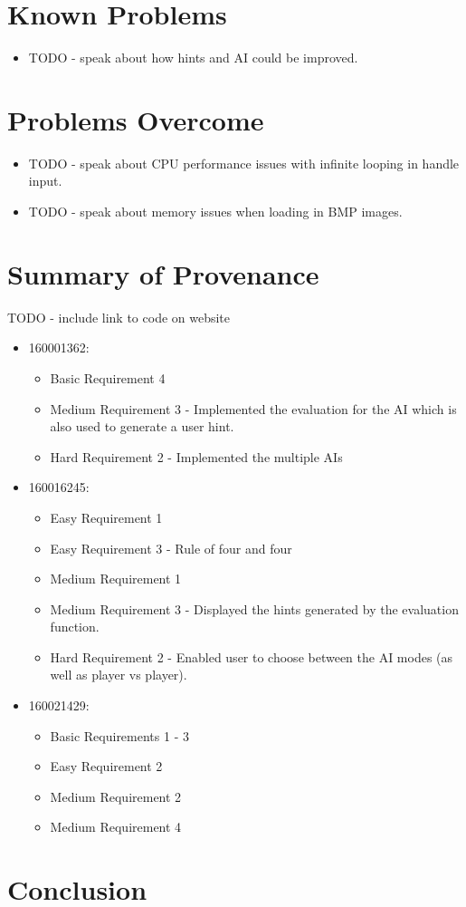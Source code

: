 \documentclass[11]{article}
\begin{document}
		
	\section{Known Problems}
		\begin{itemize}
			\item TODO - speak about how hints and AI could be improved.
		\end{itemize}
		
	\section{Problems Overcome}
		\begin{itemize}
			\item TODO - speak about CPU performance issues with infinite looping in handle input.
			\item TODO - speak about memory issues when loading in BMP images.
		\end{itemize}

	\section{Summary of Provenance}
			TODO - include link to code on website
			\begin{itemize}
				\item 160001362:
					\begin{itemize}
						\item Basic Requirement 4
						\item Medium Requirement 3 - Implemented the evaluation for the AI which is also used to generate a user hint.
						\item Hard Requirement 2 - Implemented the multiple AIs
					\end{itemize}
					
				\item 160016245:
					\begin{itemize}
						\item Easy Requirement 1
						\item Easy Requirement 3 - Rule of four and four
						\item Medium Requirement 1
						\item Medium Requirement 3 - Displayed the hints generated by the evaluation function.
						\item Hard Requirement 2 - Enabled user to choose between the AI modes (as well as player vs player).
					\end{itemize}
					
				\item 160021429:
					\begin{itemize}
						\item Basic Requirements 1 - 3
						\item Easy Requirement 2
						\item Medium Requirement 2
						\item Medium Requirement 4
					\end{itemize}
			\end{itemize}
				
	
\section{Conclusion}
\end{document}
